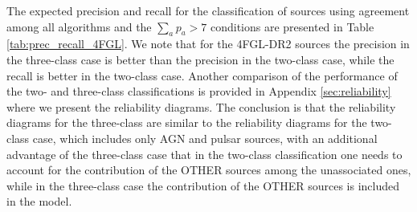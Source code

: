 \documentclass[referee]{aa} %
\begin{document}
The expected precision and recall for the classification of sources using agreement among all algorithms and the
$\sum_a p_a > 7$ conditions are presented in Table \ref{tab:prec_recall_4FGL}.
We note that for the 4FGL-DR2 sources the
precision in the three-class case is better than the precision in the two-class case, while the recall is better in the two-class case.
Another comparison of the performance of the two- and three-class classifications is provided in Appendix \ref{sec:reliability} where we present the reliability diagrams.
The conclusion is that the reliability diagrams for the three-class are similar to the reliability diagrams for the two-class case, which includes only AGN and pulsar sources, with an additional advantage of the three-class case that in the two-class classification one needs to account for the contribution of the OTHER sources among the unassociated ones, while in the three-class case the contribution of the OTHER sources is included in the model.

\begin{table}[!h]
    \caption{Testing accuracy of the four selected algorithms for the three-class classification of 4FGL-DR2 sources.}
    \label{tab:selected_algs_4fgl_multi}

\centering
\hspace{-0.2cm}
\end{table}
\end{document}
